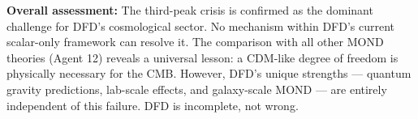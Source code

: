 \documentclass[11pt,a4paper]{article}
\begin{document}
\textbf{Overall assessment:} The third-peak crisis is confirmed as the dominant challenge for DFD's cosmological sector. No mechanism within DFD's current scalar-only framework can resolve it. The comparison with all other MOND theories (Agent 12) reveals a universal lesson: a CDM-like degree of freedom is physically necessary for the CMB. However, DFD's unique strengths --- quantum gravity predictions, lab-scale effects, and galaxy-scale MOND --- are entirely independent of this failure. DFD is incomplete, not wrong.
\end{document}
